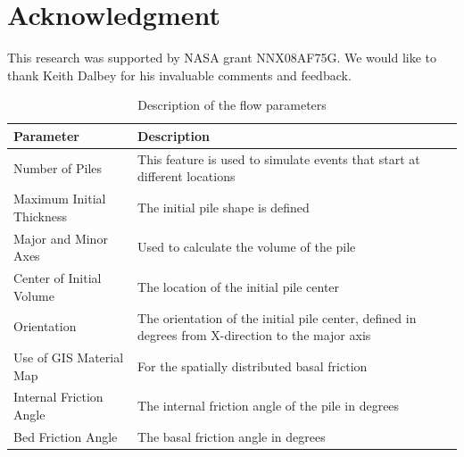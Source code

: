 \documentclass[12pt,letterpaper]{article}
\begin{document}
\section{Acknowledgment}
  
This research was supported by NASA grant NNX08AF75G.  We would like
to thank Keith Dalbey for his invaluable comments and feedback.




 


\newpage \linespread{1.0}

  \begin{table}[H]
    \caption{\textnormal{Description of the flow parameters }}
    \begin{tabular}{p{5cm} p{8cm}}
      \hline
      \textbf{Parameter} & \textbf{Description} \\
      \hline
      Number of Piles & This feature is used to simulate events that start at different locations \\
      Maximum Initial Thickness & The initial pile shape is defined  \\
      Major and Minor Axes & Used to calculate the volume of the pile\\
      Center of Initial Volume & The location of the initial pile center \\
      Orientation & The orientation of the initial pile center, defined in degrees from X-direction to the major axis\\
      Use of GIS Material Map & For the spatially distributed basal friction \\
      Internal Friction Angle & The internal friction angle of the pile in degrees \\
      Bed Friction Angle & The basal friction angle in degrees \\
      \hline
    \end{tabular}
    \label{tab:Table1}
  \end{table}
\end{document}
